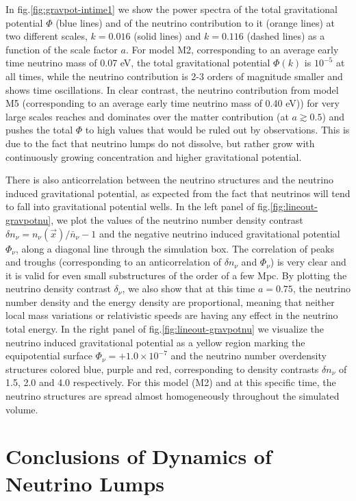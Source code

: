 In fig.\ref{fig:gravpot-intime1} we show the power spectra of the
total gravitational potential $\Phi$ (blue lines) and of the neutrino
contribution to it (orange lines) at two different scales, $k=0.016$
(solid lines) and $k=0.116$ (dashed lines) as a function of the scale
factor $a$. For model M2, corresponding to an average early time
neutrino mass of 0.07 eV, the total gravitational potential $\Phi(k)$
is $10^{-5}$ at all times, while the neutrino contribution is 2-3
orders of magnitude smaller and shows time oscillations. In clear
contrast, the neutrino contribution from model M5 (corresponding to
an average early time neutrino mass of 0.40 eV)) for very large scales
reaches and dominates over the matter contribution (at $a\gtrsim0.5$)
and pushes the total $\Phi$ to high values that would be ruled out
by observations. This is due to the fact that neutrino lumps do not
dissolve, but rather grow with continuously growing concentration
and higher gravitational potential.

There is also anticorrelation between the neutrino structures and
the neutrino induced gravitational potential, as expected from the
fact that neutrinos will tend to fall into gravitational potential
wells. In the left panel of fig.\ref{fig:lineout-gravpotnu}, we plot
the values of the neutrino number density contrast $\delta n_{\nu}=n_{\nu}(\vec{x})/\bar{n}_{\nu}-1$
and the negative neutrino induced gravitational potential $\Phi_{\nu}$,
along a diagonal line through the simulation box. The correlation
of peaks and troughs (corresponding to an anticorrelation of $\delta n_{\nu}$
and $\Phi_{\nu}$) is very clear and it is valid for even small substructures
of the order of a few Mpc. By plotting the neutrino density contrast
$\delta_{\nu}$, we also show that at this time $a=0.75$, the neutrino
number density and the energy density are proportional, meaning that
neither local mass variations or relativistic speeds are having any
effect in the neutrino total energy. In the right panel of fig.\ref{fig:lineout-gravpotnu}
we visualize the neutrino induced gravitational potential as a yellow
region marking the equipotential surface $\Phi_{\nu}=+1.0\times10^{-7}$
and the neutrino number overdensity structures colored blue, purple
and red, corresponding to density contrasts $\delta n_{\nu}$ of 1.5,
2.0 and 4.0 respectively. For this model (M2) and at this specific
time, the neutrino structures are spread almost homogeneously throughout
the simulated volume.




\section{Conclusions of Dynamics of Neutrino Lumps}

